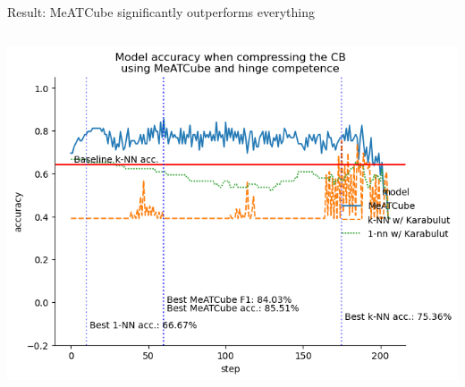 \documentclass[]{beamer}
\begin{document}
\begin{frame}{Result: MeATCube significantly outperforms everything}
\begin{columns}
\begin{column}{.65\textwidth}
            \includegraphics[width=.8\textwidth]{../results-weight-estim+/figs/liver+disorders.png}
        \end{column}
    \end{columns}
\end{frame}
\end{document}
